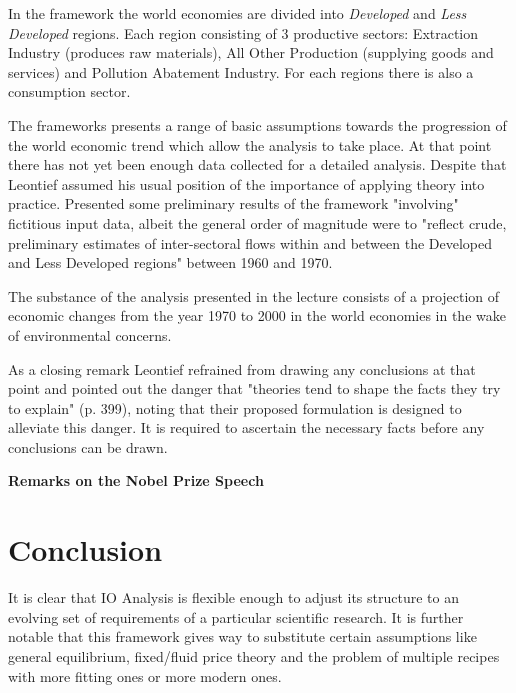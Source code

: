 \documentclass[12pt,a4paper]{scrartcl}
\begin{document}
	In the framework the world economies are divided into \textit{Developed} and \textit{Less Developed} regions. Each region consisting of 3 productive sectors: Extraction Industry (produces raw materials), All Other Production (supplying goods and services) and Pollution Abatement Industry. For each regions there is also a consumption sector.
	
	The frameworks presents a range of basic assumptions towards the progression of the world economic trend which allow the analysis to take place. At that point there has not yet been enough data collected for a detailed analysis. Despite that Leontief assumed his usual position of the importance of applying theory into practice. Presented some preliminary results of the framework "involving" fictitious input data, albeit the general order of magnitude were to "reflect crude, preliminary estimates of inter-sectoral flows within and between the Developed and Less Developed regions" \cite[p. 389]{leontief1974} between 1960 and 1970.
	
	The substance of the analysis presented in the lecture consists of a projection of economic changes from the year 1970 to 2000 in the world economies in the wake of environmental concerns. 
	
	As a closing remark Leontief refrained from drawing any conclusions at that point and pointed out the danger that "theories tend to shape the facts they try to explain" (p. 399), noting that their proposed formulation is designed to alleviate this danger. It is required to ascertain the necessary facts before any conclusions can be drawn. \cite[pp. 387-401]{leontief1974} \cite[pp. 75-77]{dymond2015recent}
	
	\textbf{Remarks on the Nobel Prize Speech}	
		

	\section{Conclusion}
	
	It is clear that IO Analysis is flexible enough to adjust its structure to an evolving set of requirements of a particular scientific research. It is further notable that this framework gives way to substitute certain assumptions like general equilibrium, fixed/fluid price theory and the problem of multiple recipes  with more fitting ones or more modern ones. 
	
\end{document}
